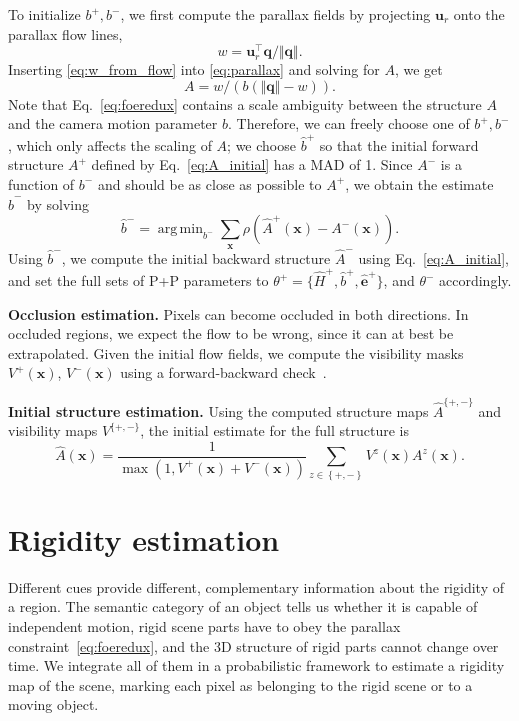 \documentclass[10pt,twocolumn,letterpaper]{article}
\DeclareMathOperator*{\argmin}{arg\,min}
\begin{document}
To initialize $b^+,b^-$, we first compute the parallax fields by projecting $\mathbf{u}_r$ onto the parallax flow lines,
\begin{equation}
w = \mathbf{u}_r^{\top} \mathbf{q} / \Vert \mathbf{q} \Vert .
\label{eq:w_from_flow}
\end{equation}
Inserting \eqref{eq:w_from_flow} into \eqref{eq:parallax} and solving for $A$, we get
\begin{equation}
A = w / \left( b \left(\Vert \mathbf{q} \Vert - w \right)\right).
\label{eq:A_initial}
\end{equation}
Note that Eq.~\eqref{eq:foeredux} contains a scale ambiguity between the structure $A$ and the camera motion parameter $b$.
Therefore, we can freely choose one of $b^+, b^-$, which only affects the scaling of $A$; we choose $\hat{b}^+$ so that the initial forward structure $A^+$ defined by Eq.~\eqref{eq:A_initial} has a MAD of 1.
Since $A^-$ is a function of $b^-$ and should be as close as possible to $A^+$, we obtain the estimate $\hat{b}^-$ by solving
\begin{equation}
\hat{b}^- = \argmin_{b^-} \sum_{\mathbf{x}} \rho \left( \hat{A}^+(\mathbf{x}) - A^-(\mathbf{x}) \right).
\end{equation}
Using $\hat{b}^-$, we compute the initial backward structure $\hat{A}^-$ using Eq.~\eqref{eq:A_initial}, and set the full sets of P+P parameters to $\theta^+ = \{ \hat{H}^+, \hat{b}^+, \mathbf{\hat{e}}^+ \}$, and $\theta^-$ accordingly.

{\bf Occlusion estimation.}
\noindent
Pixels can become occluded in both directions. In occluded regions, we expect the flow to be wrong, since it can at best be extrapolated.
Given the initial flow fields,
we compute the visibility masks $V^+(\mathbf{x})$, $V^-(\mathbf{x})$ using a forward-backward check~\cite{Kalal2010}.


{\bf Initial structure estimation.}
\noindent
Using the computed structure maps $\hat{A}^{ \{+,- \} }$ and visibility maps $V^{ \{ +, - \} }$, the initial estimate for the full structure is 
\begin{equation}
\hat{A}(\mathbf{x}) = \frac{1}{\max(1, V^+(\mathbf{x}) + V^-(\mathbf{x}))}
\sum_{z \in \left\lbrace +, - \right\rbrace}
V^z(\mathbf{x}) A^z(\mathbf{x}).
\end{equation}
 \section{Rigidity estimation}
\noindent
Different cues provide different, complementary information about the rigidity of a region.
The semantic category of an object tells us whether it is capable of independent motion, rigid scene parts have to obey the parallax constraint~\eqref{eq:foeredux}, and the 3D structure of rigid parts cannot change over time.
We integrate all of them in a probabilistic framework to estimate a rigidity map of the scene, marking each pixel as belonging to the rigid scene or to a moving object. 
\end{document}
